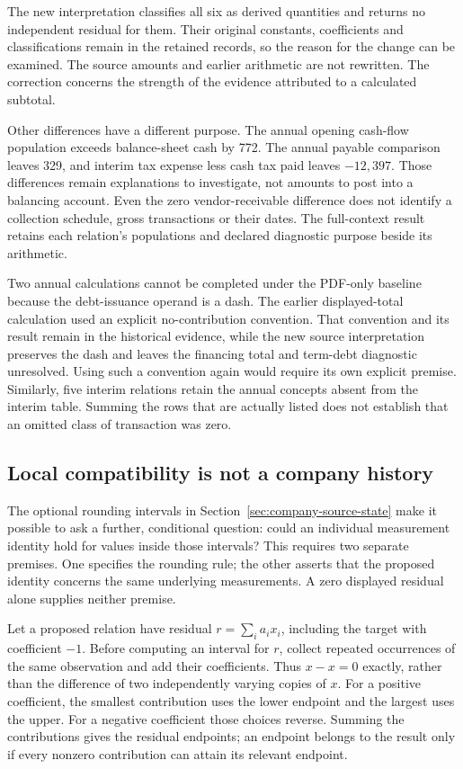 The new interpretation classifies all six as derived quantities and returns
no independent residual for them. Their original constants, coefficients
and classifications remain in the retained records, so the reason for the
change can be examined. The source amounts and earlier arithmetic are not
rewritten. The correction concerns the strength of the evidence attributed
to a calculated subtotal.

Other differences have a different purpose. The annual opening cash-flow
population exceeds balance-sheet cash by 772. The annual payable comparison
leaves 329, and interim tax expense less cash tax paid leaves
\(-12{,}397\). Those differences remain explanations to investigate, not
amounts to post into a balancing account. Even the zero vendor-receivable
difference does not identify a collection schedule, gross transactions or
their dates. The full-context result retains each relation's populations
and declared diagnostic purpose beside its arithmetic.

Two annual calculations cannot be completed under the PDF-only baseline because
the debt-issuance operand is a dash. The earlier displayed-total calculation
used an explicit no-contribution convention. That convention and its result
remain in the historical evidence, while the new source interpretation
preserves the dash and leaves the financing total and term-debt diagnostic
unresolved. Using such a convention again would require its own explicit
premise. Similarly, five interim relations retain the annual concepts absent
from the interim table. Summing the rows that are actually listed does not
establish that an omitted class of transaction was zero.

\subsection{Local compatibility is not a company history}

The optional rounding intervals in Section~\ref{sec:company-source-state}
make it possible to ask a further, conditional question: could an individual
measurement identity hold for values inside those intervals? This requires
two separate premises. One specifies the rounding rule; the other asserts
that the proposed identity concerns the same underlying measurements.
A zero displayed residual alone supplies neither premise.

Let a proposed relation have residual \(r=\sum_i a_i x_i\), including
the target with coefficient \(-1\). Before computing an interval for
\(r\), collect repeated occurrences of the same observation and add their
coefficients. Thus \(x-x=0\) exactly, rather than the difference of two
independently varying copies of \(x\). For a positive coefficient, the
smallest contribution uses the lower endpoint and the largest uses the
upper. For a negative coefficient those choices reverse. Summing the
contributions gives the residual endpoints; an endpoint belongs to the
result only if every nonzero contribution can attain its relevant endpoint.

